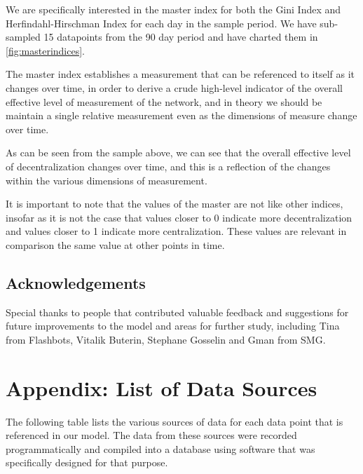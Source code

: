 \documentclass[conference]{IEEEtran}
\begin{document}
We are specifically interested in the master index for both the Gini Index and Herfindahl-Hirschman Index for each day in the sample period.  We have sub-sampled 15 datapoints from the 90 day period and have charted them in \ref{fig:masterindices}.

The master index establishes a measurement that can be referenced to itself as it changes over time, in order to derive a crude high-level indicator of the overall effective level of measurement of the network, and in theory we should be maintain a single relative measurement even as the dimensions of measure change over time.

As can be seen from the sample above, we can see that the overall effective level of decentralization changes over time, and this is a reflection of the changes within the various dimensions of measurement.

It is important to note that the values of the master are not like other indices, insofar as it is not the case that values closer to 0 indicate more decentralization and values closer to 1 indicate more centralization.  These values are relevant in comparison the same value at other points in time.

\subsection{Acknowledgements}

Special thanks to people that contributed valuable feedback and suggestions for future improvements to the model and areas for further study, including Tina from Flashbots, Vitalik Buterin, Stephane Gosselin and Gman from SMG.


\newpage

\printbibliography

\newpage

\onecolumn

\section{Appendix: List of Data Sources}

\vspace{12pt}

The following table lists the various sources of data for each data point that is referenced in our model.  The data from these sources were recorded programmatically and compiled into a database using software that was specifically designed for that purpose.
\end{document}
